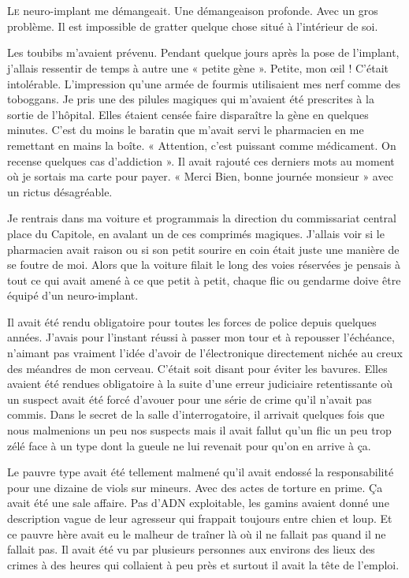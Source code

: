 \chapter{}

\lettrine[lines=1]{L}{e} neuro-implant me démangeait. Une démangeaison profonde. Avec un gros problème. Il est
impossible de gratter quelque chose situé à l'intérieur de soi.

Les toubibs m'avaient prévenu. Pendant quelque jours après la pose de l'implant, j'allais ressentir de temps à autre
une « petite gène ». Petite, mon œil ! C'était intolérable. L'impression qu'une armée de fourmis utilisaient mes nerf
comme des toboggans. Je pris une des pilules magiques qui m'avaient été prescrites à la sortie de l'hôpital. Elles
étaient censée faire disparaître la gène en quelques minutes. C'est du moins le baratin que m'avait servi le
pharmacien en me remettant en mains la boîte. « Attention, c'est puissant comme médicament. On recense quelques cas
d'addiction ». Il avait rajouté ces derniers mots au moment où je sortais ma carte pour payer. « Merci Bien, bonne
journée monsieur » avec un rictus désagréable.

Je rentrais dans ma voiture et programmais la direction du commissariat central place du Capitole, en avalant un de ces
comprimés magiques. J'allais voir si le pharmacien avait raison ou si son petit sourire en coin était juste une manière
de se foutre de moi. Alors que la voiture filait le long des voies réservées je pensais à tout ce qui avait amené à ce
que petit à petit, chaque flic ou gendarme doive être équipé d'un neuro-implant.

Il avait été rendu obligatoire pour toutes les forces de police depuis quelques années. J'avais pour l'instant réussi à
passer mon tour et à repousser l'échéance, n'aimant pas vraiment l'idée d'avoir de l'électronique directement nichée au
creux des méandres de mon cerveau. C'était soit disant pour éviter les bavures. Elles avaient été rendues obligatoire à
la suite d'une erreur judiciaire retentissante où un suspect avait été forcé d'avouer pour une série de crime qu'il
n'avait pas commis. Dans le secret de la salle d'interrogatoire, il arrivait quelques fois que nous malmenions un peu
nos suspects mais il avait fallut qu'un flic un peu trop zélé face à un type dont la gueule ne lui revenait pour qu'on
en arrive à ça.

Le pauvre type avait été tellement malmené qu'il avait endossé la responsabilité pour une dizaine de viols sur mineurs.
Avec des actes de torture en prime. Ça avait été une sale affaire. Pas d'ADN exploitable, les gamins avaient donné une
description vague de leur agresseur qui frappait toujours entre chien et loup. Et ce pauvre hère avait eu le malheur de
traîner là où il ne fallait pas quand il ne fallait pas. Il avait été vu par plusieurs personnes aux environs des lieux
des crimes à des heures qui collaient à peu près et surtout il avait la tête de l'emploi.


